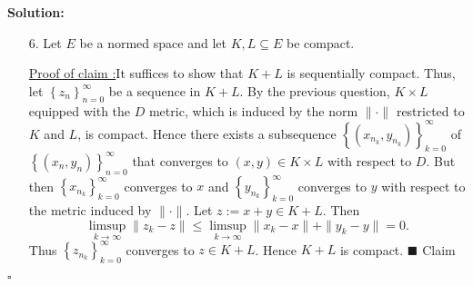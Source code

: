 \documentclass[12pt]{article}
\newcounter{ProofCounter}
\newcounter{ClaimCounter}[ProofCounter]
\newenvironment{Solution}{\stepcounter{ProofCounter}\textbf{Solution:}}{\hfill$\square$}
\newenvironment{claim}[1]{\vspace{1mm}\stepcounter{ClaimCounter}\par\noindent\underline{\bf Claim \theClaimCounter:}\space#1}{}
\newenvironment{claimproof}[1]{\par\noindent\underline{Proof of claim \theClaimCounter:}\space#1}{\hfill $\blacksquare$ Claim \theClaimCounter}
\begin{document}
\begin{Solution}
\begin{enumerate}
      \begin{claimproof}
        Since $K$ is a metric space, it suffices to show that $K$ is sequentially compact.
        Let $\left\{ x_k \right\}_{k=0}^{\infty}$ be a sequence in $K$, where $x_k := (x_{k,1}, \dots, x_{k,n})$ for each $k \in \mathbb{N}$.
        Since $K_1$ is compact, there exists a subsequence $\{x_{k_j, 1}\}_{j=0}^{\infty}$ of $\{x_{k,1}\}_{k=0}^{\infty}$ that
        converges in $K_1$. But since $K_2$ is compact, there exists a convergent subsequence
        $\{x_{k_{j_i},2}\}_{i=0}^{\infty}$ of $\{x_{k_j,2}\}_{j=0}^{\infty}$ that converges in $K_2$. Continuing in this manner, we can construct a
        subsequence $\{x_{k}'\}_{k=0}^{\infty}$ of $\{x_{k}\}_{k=0}^{\infty}$, where $x_{k}' = (x_{k,1}', \dots, x_{k,n}')$, 
        such that $\{x_{k,m}'\}_{k=0}^{\infty}$ converges in $K_m$ for each $m = 1, \dots, n$. Let $y_{m}$ be the limit of
        $\{x_{k,m}'\}_{k=0}^{\infty}$ be each $m = 1, \dots, n$. Let $y := (y_1, \dots, y_n) \in K$. Then 
        \[
          \lim_{k\rightarrow\infty} d(x_{k}', y) = \lim_{k\rightarrow\infty} \sum_{m=1}^{n}d_{m}(x_{k,m}', y_{m}) =
          \sum_{m=1}^{n}\lim_{k\rightarrow\infty} d_{m}(x_{k,m}', y_{m}) = 0.
        \]
        Hence $\left\{ x_{k}' \right\}_{k=0}^{\infty}$ converges in $K$.
      \end{claimproof}


    \item[6.] Let $E$ be a normed space and let $K, L \subseteq E$ be compact.

      \begin{claimproof}
        It suffices to show that $K + L$ is sequentially compact. Thus, let $\left\{ z_n \right\}_{n=0}^{\infty}$ be a sequence in $K + L$.  
        By the previous question, $K\times L$ equipped with the $D$ metric, which is induced by the norm $\|\cdot \|$ restricted to $K$ and $L$, is
        compact. Hence there exists a subsequence $\left\{ (x_{n_k}, y_{n_k}) \right\}_{k=0}^{\infty}$ of $\left\{ (x_n, y_n) \right\}_{n=0}^{\infty}$
        that converges to $(x, y) \in K\times L$ with respect to $D$. But then $\left\{ x_{n_k} \right\}_{k=0}^{\infty}$ converges to $x$ and 
        $\left\{ y_{n_k} \right\}_{k=0}^{\infty}$ converges to $y$ with respect to the metric induced by $\|\cdot \|$. Let $z := x + y \in K + L$.  
        Then
        \[
          \limsup_{k\rightarrow\infty}\|z_k - z\| \leq \limsup_{k\rightarrow\infty}\|x_k - x\| + \|y_k - y\| = 0.
        \]
        Thus $\left\{ z_{n_k} \right\}_{k=0}^{\infty}$ converges to $z \in K + L$. Hence $K + L$ is compact.
      \end{claimproof}

  \end{enumerate}
\end{Solution}
\end{document}
